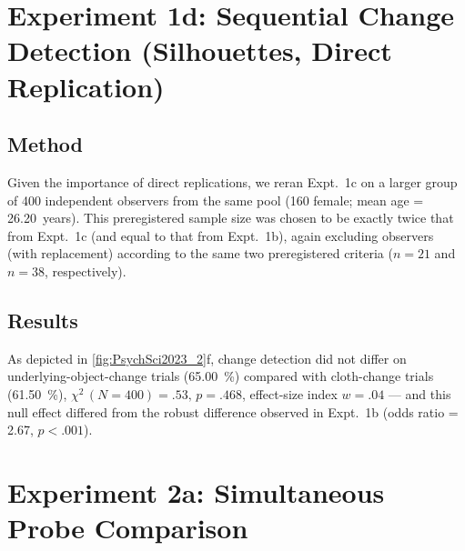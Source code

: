\section[Experiment 1d: Seq. Change Detection (Silhouettes, Dir. Replication)]{Experiment 1d: Sequential Change Detection (Silhouettes, Direct Replication)}

\subsection{Method}
Given the importance of direct replications, we reran Expt.~1c on a larger group of 400 independent observers from the same pool (160 female; mean age = 26.20~years). This preregistered sample size was chosen to be exactly twice that from Expt.~1c (and equal to that from Expt.~1b), again excluding observers (with replacement) according to the same two preregistered criteria ($n = 21$ and $n = 38$, respectively).

\subsection{Results}

As depicted in \cref{fig:PsychSci2023_2}f, change detection did not differ on underlying-object-change trials (\qty{65.00}{\percent}) compared with cloth-change trials (\qty{61.50}{\percent}), $\chi^2\,(N = 400) = .53,\,p = .468$, effect-size index $w = .04$ --- and this null effect differed from the robust difference observed in Expt.~1b (odds ratio = 2.67, $p < .001$).


\section{Experiment 2a: Simultaneous Probe Comparison}

